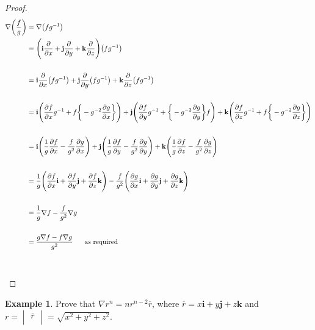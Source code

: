 \documentclass[11pt,a4paper]{article}
\theoremstyle{definition}
\newtheorem{exa}[thm]{Example}
\begin{document}
\begin{proof}
\begin{align*}
\nabla \bigg(\frac{f}{g}\bigg) & = \nabla \big(fg^{-1}\big)\\
& = \Bigg(\textbf{i} \frac{\partial}{\partial x} + \textbf{j} \frac{\partial}{\partial y} + \textbf{k}\frac{\partial}{\partial z}\Bigg) \big(fg^{-1}\big)\\\\
& = \textbf{i}\frac{\partial}{\partial x}\big(fg^{-1}\big) + \textbf{j}\frac{\partial}{\partial y}\big(fg^{-1}\big) + \textbf{k} \frac{\partial}{\partial z}\big(fg^{-1}\big)\\\\
& = \textbf{i}\Bigg(\frac{\partial f}{\partial x}g^{-1} + f\bigg\{-g^{-2}\frac{\partial g}{\partial x}\bigg\}\Bigg) + \textbf{j}\Bigg(\frac{\partial f}{\partial y}g^{-1} + \bigg\{-g^{-2}\frac{\partial g}{\partial y}\bigg\}f\Bigg) + \textbf{k} \Bigg(\frac{\partial f}{\partial z}g^{-1} + f\bigg\{-g^{-2}\frac{\partial g}{\partial z}\bigg\}\Bigg)\\\\
& = \textbf{i}\Bigg(\frac{1}{g}\frac{\partial f}{\partial x}-\frac{f}{g^2}\frac{\partial g}{\partial x}\Bigg) + \textbf{j}\Bigg(\frac{1}{g}\frac{\partial f}{\partial y}-\frac{f}{g^2}\frac{\partial g}{\partial y}\Bigg) + \textbf{k}\Bigg(\frac{1}{g}\frac{\partial f}{\partial z}- \frac{f}{g^2}\frac{\partial g}{\partial z}\Bigg)\\\\
& = \frac{1}{g}\Bigg( \frac{\partial f}{\partial x}\textbf{i} + \frac{\partial f}{\partial y}\textbf{j} + \frac{\partial f}{\partial z}\textbf{k}\Bigg) - \frac{f}{g^2}\Bigg(\frac{\partial g}{\partial x}\textbf{i} + \frac{\partial g}{\partial y}\textbf{j} + \frac{\partial g}{\partial z}\textbf{k}\Bigg)\\\\
& = \frac{1}{g}\nabla f - \frac{f}{g^2}\nabla g\\\\
& = \frac{g \nabla f - f \nabla g }{g^2}\hspace{0.6cm} \text{as required}\\\\\\
\end{align*}
\end{proof}

\begin{exa}


Prove that $\nabla r^{n} = n r^{n-2}\overline{r}$, where $\overline{r} = x\textbf{i} + y\textbf{j} + z\textbf{k}$ and $r = \begin{vmatrix}
\overline{r}\\
\end{vmatrix} = \sqrt{x^2 + y^2 + z^2}$.\\\\

\end{exa}
\end{document}
